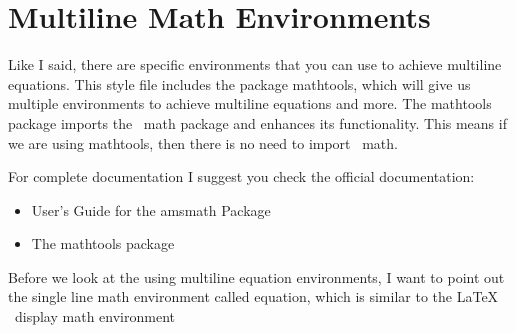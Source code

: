 \section{Multiline Math Environments}

Like I said, there are specific environments that you can use to achieve multiline 
equations. This style file includes the package mathtools, which will give us 
multiple environments to achieve multiline equations and more.  The mathtools package
imports the \AmS ~math package and enhances its functionality.  This means if we are
using mathtools, then there is no need to import \AmS ~math.

For complete documentation I suggest you check the official documentation:
\begin{itemize}
  \item User’s Guide for the amsmath Package
  \item The mathtools package
\end{itemize}

Before we look at the using multiline equation environments, I want to point out
the single line math environment called equation, which is similar to the \LaTeX 
~display math environment 
 
